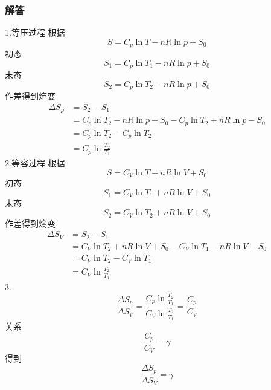 \subsubsection{解答}
1.等压过程
根据
\begin{equation}
    S=C_p\ln T-nR\ln p+S_0
\end{equation}
初态
\begin{equation}
    S_1=C_p\ln T_1-nR\ln p+S_0
\end{equation}
末态
\begin{equation}
    S_2=C_p\ln T_2-nR\ln p+S_0
\end{equation}
作差得到熵变
\begin{equation}
    \begin{aligned}
        \Delta S_p&=S_2-S_1
\\
&=C_p\ln T_2-nR\ln p+S_0-C_p\ln T_2+nR\ln p-S_0
\\
&=C_p\ln T_2-C_p\ln T_2
\\
&=C_p\ln \frac{T_2}{T_1}
    \end{aligned}
\end{equation}
2.等容过程
根据
\begin{equation}
    S=C_V\ln T+nR\ln V+S_0
\end{equation}
初态
\begin{equation}
    S_1=C_V\ln T_1+nR\ln V+S_0
\end{equation}
末态
\begin{equation}
    S_2=C_V\ln T_2+nR\ln V+S_0
\end{equation}
作差得到熵变
\begin{equation}
    \begin{aligned}
        \Delta S_V&=S_2-S_1
\\
&=C_V\ln T_2+nR\ln V+S_0-C_V\ln T_1-nR\ln V-S_0
\\
&=C_V\ln T_2-C_V\ln T_1
\\
&=C_V\ln \frac{T_2}{T_1}
    \end{aligned}
\end{equation}
3.
\begin{equation}
    \frac{\Delta S_p}{\Delta S_V}=\frac{C_p\ln \frac{T_2}{T_1}}{C_V\ln \frac{T_2}{T_1}}=\frac{C_p}{C_V}
\end{equation}
关系
\begin{equation}
    \frac{C_p}{C_V}=\gamma 
\end{equation}
得到
\begin{equation}
    \frac{\Delta S_p}{\Delta S_V}=\gamma 
\end{equation}

